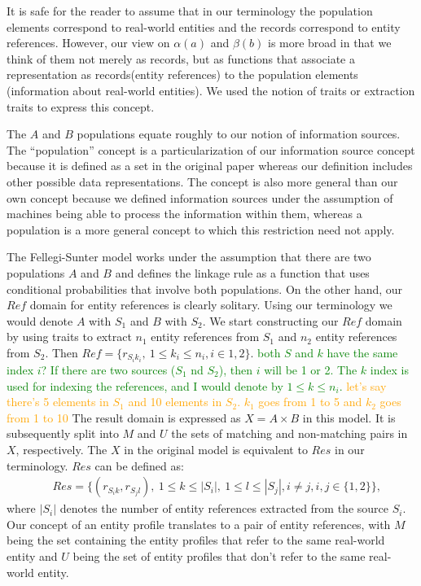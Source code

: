 \documentclass[11pt]{article}
\begin{document}
    It is safe for the reader to assume that in our terminology the population
    elements correspond to real-world entities and the records correspond to
    entity references.
    However, our view on $\alpha(a)$ and $\beta(b)$ is more broad in that we
    think of them not merely as records, but as functions that associate a
    representation as records(entity references) to the population elements
    (information about real-world entities).
    We used the notion of traits or extraction traits to express this concept.
        
    The $A$ and $B$ populations equate roughly to our notion of information
    sources.
    The ``population'' concept is a particularization of our information source
    concept because it is defined as a set in the original paper whereas our
    definition includes other possible data representations.
    The concept is also more general than our own concept because we defined
    information sources under the assumption of machines being able to process
    the information within them, whereas a population is a more general concept
    to which this restriction need not apply.

    The Fellegi-Sunter model works under the assumption that there are two
    populations $A$ and $B$ and defines the linkage rule as a function that uses
    conditional probabilities that involve both populations.
    On the other hand, our $Ref$ domain for entity references is clearly
    solitary.
    Using our terminology we would denote $A$ with $S_1$ and $B$ with $S_2$.
    We start constructing our $Ref$ domain by using traits to extract $n_1$
    entity references from $S_1$ and $n_2$ entity references from $S_2$.
    Then $Ref = \{r_{{S_i}{k_i}},~1 \leq k_i \leq n_i, i \in {1, 2} \}$.
    \textcolor{green}{both $S$ and $k$ have the same index $i$? If there are two sources ($S_1$ nd $S_2$), then $i$ will be 1 or 2. The $k$ index is used for indexing the references, and I would denote by $1 \leq k \leq n_i$.}
    \textcolor{orange}{let's say there's 5 elements in $S_1$ and 10 elements in
    $S_2$. $k_1$ goes from 1 to 5 and $k_2$ goes from 1 to 10}
    The result domain is expressed as $X = A \times B$ in this model.
    It is subsequently split into $M$ and $U$ the sets of matching and
    non-matching pairs in $X$, respectively.
    The $X$ in the original model is equivalent to $Res$ in our terminology.
    $Res$ can be defined as:
    \begin{align}
        &Res = \{(r_{{S_i}{k}}, r_{{S_j}{l}}),~1 \leq k \leq |S_i|,~1
        \leq l \leq |S_j|, i \neq j, i,j \in \{1, 2\}\}\textrm{,}\nonumber
    \end{align}
    where $|S_i|$ denotes the number of entity references extracted from the
    source $S_i$.
    Our concept of an entity profile translates to a pair of entity references,
    with $M$ being the set containing the entity profiles that refer to the same
    real-world entity and $U$ being the set of entity profiles that don't refer
    to the same real-world entity.
\end{document}
